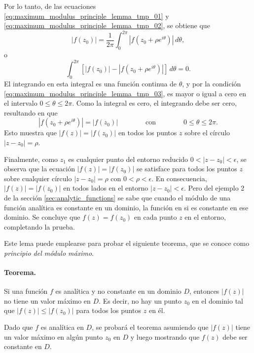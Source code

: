 \documentclass[a4paper]{report}
\begin{document}
Por lo tanto, de las ecuaciones \ref{eq:maximum_modulus_principle_lemma_tmp_01} y \ref{eq:maximum_modulus_principle_lemma_tmp_02}, se obtiene que 
\[
 |f(z_0)|=\frac{1}{2\pi}\int_0^{2\pi}|f(z_0+\rho e^{i\theta})|\,d\theta,
\]
o
\[
 \int_0^{2\pi}\left[|f(z_0)|-|f(z_0+\rho e^{i\theta})|\right]\,d\theta=0.
\]
El integrando en esta integral es una función continua de \(\theta\), y por la condición \ref{eq:maximum_modulus_principle_lemma_tmp_03}, es mayor o igual a cero en el intervalo \(0\leq\theta\leq2\pi\). Como la integral es cero, el integrando debe ser cero, resultando en que
\[
 |f(z_0+\rho e^{i\theta})|=|f(z_0)|
 \qquad\qquad\textrm{con}\qquad\qquad
 0\leq\theta\leq2\pi.
\]
Esto muestra que \(|f(z)|=|f(z_0)|\) en todos los puntos \(z\) sobre el círculo \(|z-z_0|=\rho\).

Finalmente, como \(z_1\) es cualquier punto del entorno reducido \(0<|z-z_0|<\epsilon\), se observa que la ecuación \(|f(z)|=|f(z_0)|\) se satisface para todos los puntos \(z\) sobre cualquier círculo \(|z-z_0|=\rho\) con \(0<\rho<\epsilon\). En consecuencia, \(|f(z)|=|f(z_0)|\) en todos lados en el entorno \(|z-z_0|<\epsilon\). Pero del ejemplo 2 de la sección \ref{sec:analytic_functions} se sabe que cuando el módulo de una función analítica es constante en un dominio, la función en si es constante en ese dominio. Se concluye que \(f(z)=f(z_0)\) en cada punto \(z\) en el entorno, completando la prueba.

Este lema puede emplearse para probar el siguiente teorema, que se conoce como \emph{principio del módulo máximo}.

\paragraph{Teorema.} Si una función \(f\) es analítica y no constante en un dominio \(D\), entonces \(|f(z)|\) no tiene un valor máximo en \(D\). Es decir, no hay un punto \(z_0\) en el dominio tal que \(|f(z)|\leq|f(z_0)|\) para todos los puntos \(z\) en él.

Dado que \(f\) es analítica en \(D\), se probará el teorema asumiendo que \(|f(z)|\) tiene un valor máximo en algún punto \(z_0\) en \(D\) y luego mostrando que \(f(z)\) debe ser constante en \(D\). 
\end{document}

